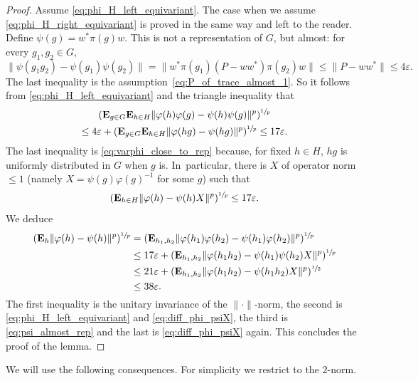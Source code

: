 \documentclass[10pt]{amsart}
\theoremstyle{plain}
\theoremstyle{definition}
\newcommand{\E}{\mathbf{E}}
\begin{document}
\begin{proof}
Assume \eqref{eq:phi_H_left_equivariant}. The case when we assume \eqref{eq:phi_H_right_equivariant} is proved in the same way and left to the reader. Define $\psi(g) = w^* \pi(g) w$. This is not a representation of $G$, but almost: for every $g_1,g_2 \in G$,\vspace*{-3pt}
\begin{equation}\label{eq:psi_almost_rep} \| \psi(g_1g_2) - \psi(g_1)\psi(g_2)\| = \| w^* \pi(g_1) (P-ww^*) \pi(g_2) w\| \leq \|P-ww^*\| \leq 4\varepsilon.
\end{equation}
The last inequality is the assumption~\eqref{eq:P_of_trace_almost_1}. So it follows from \eqref{eq:phi_H_left_equivariant} and the triangle inequality that\vspace*{-5pt}
\begin{multline*} (\E_{g \in G} \E_{h \in H} \|\varphi(h)\varphi(g) - \psi(h) \psi(g)\|^p)^{\sfrac 1 p} \\\leq 4\varepsilon + (\E_{g \in G} \E_{h \in H} \|\varphi(hg) - \psi(hg)\|^p)^{\sfrac 1 p} \leq 17 {\varepsilon}.
\end{multline*}
The last inequality is \eqref{eq:varphi_close_to_rep} because, for fixed $h \in H$, $hg$ is uniformly distributed in $G$ when $g$ is. In~particular, there is $X$ of operator norm $\leq 1$ (namely $X=\psi(g) \varphi(g)^{-1}$ for some $g$) such that
\begin{equation}\label{eq:diff_phi_psiX} (\E_{h \in H} \|\varphi(h) - \psi(h) X\|^p)^{\sfrac 1 p} \leq 17 {\varepsilon}.
\end{equation}
We deduce
\begin{align*}
(\E_h \|\varphi(h) - \psi(h)\|^p)^{\sfrac 1 p} & = (\E_{h_1,h_2} \|\varphi(h_1)\varphi(h_2) - \psi(h_1) \varphi(h_2)\|^p)^{\sfrac 1 p} \\
& \leq 17{\varepsilon}+ (\E_{h_1,h_2} \|\varphi(h_1h_2) - \psi(h_1) \psi(h_2) X\|^p)^{\sfrac 1 p}\\
&\leq 21{\varepsilon}+ (\E_{h_1,h_2} \|\varphi(h_1h_2) - \psi(h_1h_2)X\|^p)^{\sfrac 1 2}\\
&\leq 38{\varepsilon}.
\end{align*}
The first inequality is the unitary invariance of the $\|{\cdot}\|$-norm, the second is \eqref{eq:phi_H_left_equivariant} and \eqref{eq:diff_phi_psiX}, the third is \eqref{eq:psi_almost_rep} and the last is \eqref{eq:diff_phi_psiX} again. This concludes the proof of the lemma.
\end{proof}
We will use the following consequences. For simplicity we restrict to the $2$-norm.
\end{document}
